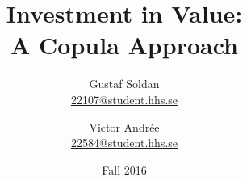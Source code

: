 \documentclass[final]{thesis}
\title{Investment in Value:\\A Copula Approach}
\author{
  Gustaf Soldan \\ \normalsize \href{mailto:22107@student.hhs.se}{22107@student.hhs.se} \and
  Victor Andrée \\ \normalsize \href{mailto:22584@student.hhs.se}{22584@student.hhs.se}
}
\date{Fall 2016}
\begin{document}

\newpage

\tableofcontents
\pagebreak


\pagebreak







\pagebreak

\pagebreak
\printbibliography
\pagebreak

\end{document}
